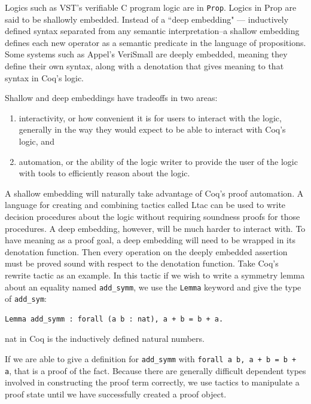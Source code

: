 \documentclass{puthesis}
\begin{document}
Logics such as VST's verifiable C program logic are in
\lstinline|Prop|. Logics in Prop are said to be shallowly embedded.
Instead of a ``deep embedding" --- inductively defined syntax
separated from any semantic interpretation--a shallow embedding
defines each new operator as a semantic predicate in the language of
propositions.  Some systems such as Appel's VeriSmall
\cite{appel11:cpp} are deeply embedded, meaning they define their own
syntax, along with a denotation that gives meaning to that syntax in
Coq's logic.

Shallow and deep embeddings have tradeoffs in two areas:

\begin{enumerate}
\item interactivity, or how convenient it is for users to interact
  with the logic, generally in the way they would expect to be able to
  interact with Coq's logic, and
\item automation, or the ability of the logic writer to provide the
  user of the logic with tools to efficiently reason about the logic.
\end{enumerate}

A shallow embedding will naturally take advantage of Coq's proof
automation. A language for creating and combining tactics called Ltac
can be used to write decision procedures about the logic without
requiring soundness proofs for those procedures. A deep embedding,
however, will be much harder to interact with. To have meaning as a
proof goal, a deep embedding will need to be wrapped in its denotation
function. Then every operation on the deeply embedded assertion must
be proved sound with respect to the denotation function. Take Coq's
rewrite tactic as an example. In this tactic if we wish to write a
symmetry lemma about an equality named \lstinline|add_symm|, we use
the \lstinline|Lemma| keyword and give the type of
\lstinline|add_sym|:

\begin{lstlisting}
Lemma add_symm : forall (a b : nat), a + b = b + a.
\end{lstlisting}
\noindent nat in Coq is the inductively defined natural numbers.

If we are able to give a definition for \lstinline|add_symm| with
\lstinline|forall a b, a + b = b + a|, that is a proof of the
fact. Because there are generally difficult dependent types involved
in constructing the proof term correctly, we use tactics to manipulate
a proof state until we have successfully created a proof object. 
\end{document}
